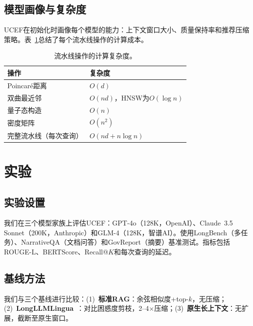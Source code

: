 \documentclass[a4paper,11pt]{ctexart}
\newcommand{\ucef}{\textsf{UCEF}}
\begin{document}
\subsection{模型画像与复杂度}

\ucef{}在初始化时画像每个模型的能力：上下文窗口大小、质量保持率和推荐压缩策略。表~\ref{tab:complexity}总结了每个流水线操作的计算成本。

\begin{table}[t]
\centering
\caption{流水线操作的计算复杂度。}
\label{tab:complexity}
\small
\begin{tabular}{@{}ll@{}}
\toprule
操作 & 复杂度 \\
\midrule
Poincar\'{e}距离      & $O(d)$ \\
双曲最近邻 & $O(nd)$，HNSW为$O(\log n)$ \\
量子态构造  & $O(n)$ \\
密度矩阵              & $O(n^{2})$ \\
完整流水线（每次查询）   & $O(nd + n\log n)$ \\
\bottomrule
\end{tabular}
\end{table}


\section{实验}
\label{sec:experiments}

\subsection{实验设置}

我们在三个模型家族上评估\ucef{}：GPT-4o（128K，OpenAI）、Claude~3.5 Sonnet（200K，Anthropic）和GLM-4（128K，智谱AI）。使用LongBench（多任务）、NarrativeQA（文档问答）和GovReport（摘要）基准测试。指标包括ROUGE-L、BERTScore、Recall@$K$和每次查询的延迟。

\subsection{基线方法}

我们与三个基线进行比较：(1)~\textbf{标准RAG}：余弦相似度+top-$k$，无压缩；(2)~\textbf{LongLLMLingua}~\cite{jiang2024longllmlingua}：对比困惑度剪枝，2--4$\times$压缩；(3)~\textbf{原生长上下文}：无扩展，截断至原生窗口。
\end{document}
